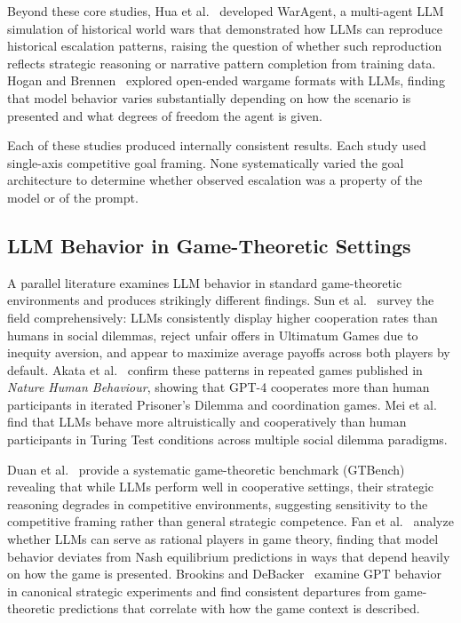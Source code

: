 \documentclass[manuscript, review=true, anonymous=true]{acmart}
\begin{document}
Beyond these core studies, Hua et al.~\cite{hua2023waragent} developed WarAgent, a multi-agent LLM simulation of historical world wars that demonstrated how LLMs can reproduce historical escalation patterns, raising the question of whether such reproduction reflects strategic reasoning or narrative pattern completion from training data.
Hogan and Brennen~\cite{hogan2024open} explored open-ended wargame formats with LLMs, finding that model behavior varies substantially depending on how the scenario is presented and what degrees of freedom the agent is given.

Each of these studies produced internally consistent results.
Each study used single-axis competitive goal framing.
None systematically varied the goal architecture to determine whether observed escalation was a property of the model or of the prompt.

\subsection{LLM Behavior in Game-Theoretic Settings}

A parallel literature examines LLM behavior in standard game-theoretic environments and produces strikingly different findings.
Sun et al.~\cite{sun2025game} survey the field comprehensively: LLMs consistently display higher cooperation rates than humans in social dilemmas, reject unfair offers in Ultimatum Games due to inequity aversion, and appear to maximize average payoffs across both players by default.
Akata et al.~\cite{akata2025playing} confirm these patterns in repeated games published in \emph{Nature Human Behaviour}, showing that GPT-4 cooperates more than human participants in iterated Prisoner's Dilemma and coordination games.
Mei et al.~\cite{mei2024turing} find that LLMs behave more altruistically and cooperatively than human participants in Turing Test conditions across multiple social dilemma paradigms.

Duan et al.~\cite{duan2024gtbench} provide a systematic game-theoretic benchmark (GTBench) revealing that while LLMs perform well in cooperative settings, their strategic reasoning degrades in competitive environments, suggesting sensitivity to the competitive framing rather than general strategic competence.
Fan et al.~\cite{fan2024can} analyze whether LLMs can serve as rational players in game theory, finding that model behavior deviates from Nash equilibrium predictions in ways that depend heavily on how the game is presented.
Brookins and DeBacker~\cite{brookins2023playing} examine GPT behavior in canonical strategic experiments and find consistent departures from game-theoretic predictions that correlate with how the game context is described.
\end{document}
